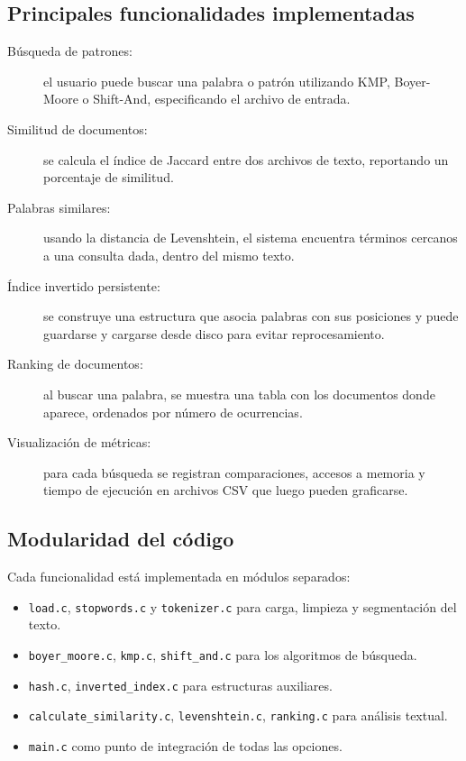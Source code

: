 \documentclass[9pt,letterpaper,onecolumn]{rho-class/rho}
\begin{document}
\subsection{Principales funcionalidades implementadas}

\begin{description}
  \item[Búsqueda de patrones:] el usuario puede buscar una palabra o patrón utilizando KMP, Boyer-Moore o Shift-And, especificando el archivo de entrada.
  
  \item[Similitud de documentos:] se calcula el índice de Jaccard entre dos archivos de texto, reportando un porcentaje de similitud.
  
  \item[Palabras similares:] usando la distancia de Levenshtein, el sistema encuentra términos cercanos a una consulta dada, dentro del mismo texto.
  
  \item[Índice invertido persistente:] se construye una estructura que asocia palabras con sus posiciones y puede guardarse y cargarse desde disco para evitar reprocesamiento.
  
  \item[Ranking de documentos:] al buscar una palabra, se muestra una tabla con los documentos donde aparece, ordenados por número de ocurrencias.
  
  \item[Visualización de métricas:] para cada búsqueda se registran comparaciones, accesos a memoria y tiempo de ejecución en archivos CSV que luego pueden graficarse.
\end{description}

\subsection{Modularidad del código}

Cada funcionalidad está implementada en módulos separados:
\begin{itemize}
  \item \texttt{load.c}, \texttt{stopwords.c} y \texttt{tokenizer.c} para carga, limpieza y segmentación del texto.
  \item \texttt{boyer\_moore.c}, \texttt{kmp.c}, \texttt{shift\_and.c} para los algoritmos de búsqueda.
  \item \texttt{hash.c}, \texttt{inverted\_index.c} para estructuras auxiliares.
  \item \texttt{calculate\_similarity.c}, \texttt{levenshtein.c}, \texttt{ranking.c} para análisis textual.
  \item \texttt{main.c} como punto de integración de todas las opciones.
\end{itemize}
\end{document}
